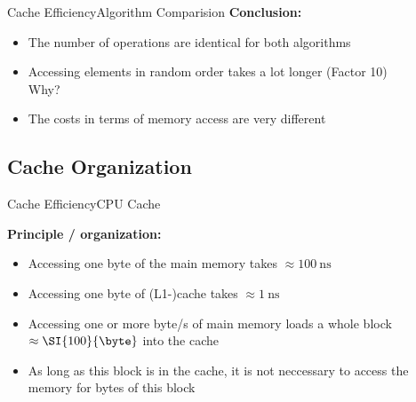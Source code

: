 
\begin{frame}{Cache Efficiency}{Algorithm Comparision}
  \textbf{Conclusion:}
  \begin{itemize}
    \item<2->
      The number of operations are identical for both algorithms
    \item<3->
      Accessing elements in random order takes a lot longer (Factor 10)\\
      {\color{cyan}Why?}
    \item<3->
      The costs in terms of memory access are very different
  \end{itemize}
\end{frame}


\subsection{Cache Organization}

\begin{frame}{Cache Efficiency}{CPU Cache}
  \vspace{-1.5em}
  \begin{figure}
    \begin{adjustbox}{width=\linewidth}
      
    \end{adjustbox}
    \label{fig:caching:cache_hirarchy}
  \end{figure}
  \textbf{Principle / organization:}
  \begin{itemize}
    \item<3->
      Accessing one byte of the main memory takes
      $\approx\SI{100}{\nano\second}$
    \item<4->
      Accessing one byte of (L1-)cache takes
      $\approx\SI{1}{\nano\second}$
    \item<5->
      Accessing one or more byte/s of main memory loads a whole
      block $\approx\SI{100}{\byte}$ into the cache
    \item<6->
      As long as this block is in the cache, it is not neccessary to
      access the memory for bytes of this block
  \end{itemize}
\end{frame}


